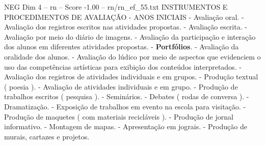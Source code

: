 \begin{textsample}{NEG Dim 4 – rn – Score -1.00 – rn/rn\_ef\_55.txt}  \label{ex:f4_neg_208}
INSTRUMENTOS E PROCEDIMENTOS DE AVALIAÇÃO - ANOS INICIAIS - Avaliação oral. - Avaliação dos registros escritos nas atividades propostas. - Avaliação escrita. - Avaliação por meio do diário de imagens. - Avaliação da participação e interação dos alunos em diferentes atividades propostas. - \textbf{Portfólios}. - Avaliação da oralidade dos alunos. - Avaliação do lúdico por meio de aspectos que evidenciem o uso das competências artísticas para exibição dos conteúdos interpretados. - Avaliação dos registros de atividades individuais e em grupos. - Produção textual ( poesia ). - Avaliação de atividades individuais e em grupo. - Produção de trabalhos escritos ( pesquisa ). - Seminários. - Debates ( rodas de conversa ). - Dramatização. - Exposição de trabalhos em evento na escola para visitação. - Produção de maquetes ( com materiais recicláveis ). - Produção de jornal informativo. - Montagem de mapas. - Apresentação em jograis. - Produção de murais, cartazes e projetos.

\end{textsample}

